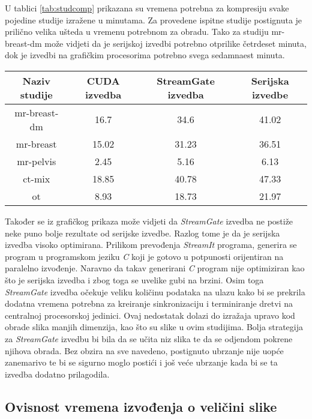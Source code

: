 \documentclass[times, utf8, zavrsni, numeric, sort]{fer}
\begin{document}
U tablici \ref{tab:studcomp} prikazana su vremena potrebna za kompresiju svake pojedine studije izražene u minutama. Za provedene ispitne studije postignuta je prilično velika ušteda u vremenu potrebnom za obradu. Tako za studiju mr-breast-dm može vidjeti da je serijskoj izvedbi potrebno otprilike četrdeset minuta, dok je  izvedbi na grafičkim procesorima potrebno svega sedamnaest minuta.
\begin{center}
 \label{tab:studcomp}
\begin{tabular}{| c | c | c | c |}
\hline
Naziv studije & CUDA izvedba & StreamGate izvedba & Serijska izvedbe
\\
\hline
mr-breast-dm & 16.7 & 34.6  & 41.02
\\
\hline
mr-breast & 15.02 & 31.23 & 36.51
\\
\hline
mr-pelvis & 2.45 & 5.16 & 6.13
\\
\hline
ct-mix & 18.85 & 40.78 & 47.33
\\
\hline
ot & 8.93 & 18.73 & 21.97
\\
\hline
\end{tabular}
\end{center}

Također se iz grafičkog prikaza može vidjeti da \emph{StreamGate} izvedba ne postiže neke puno bolje rezultate od serijske izvedbe. Razlog tome je da je serijska izvedba visoko optimirana. Prilikom prevođenja \emph{StreamIt} programa, generira se program u programskom jeziku \emph{C} koji je gotovo u potpunosti orijentiran na paralelno izvođenje.  Naravno da takav generirani \emph{C} program nije optimiziran kao što je serijska izvedba i zbog toga se uvelike gubi na brzini. Osim toga \emph{StreamGate} izvedba očekuje veliku količinu podataka na ulazu kako bi se prekrila dodatna vremena potrebna za kreiranje sinkronizaciju i terminiranje dretvi na centralnoj procesorskoj jedinici. Ovaj nedostatak dolazi do izražaja upravo kod obrade slika manjih dimenzija, kao što su slike u ovim studijima. Bolja strategija za \emph{StreamGate} izvedbu bi bila da se učita niz slika te da se odjendom pokrene njihova obrada. Bez obzira na sve navedeno, postignuto ubrzanje nije uopće zanemarivo te bi se sigurno moglo postići i još veće ubrzanje kada bi se ta izvedba dodatno prilagodila.

\subsection{Ovisnost vremena izvođenja o veličini slike}
\end{document}
